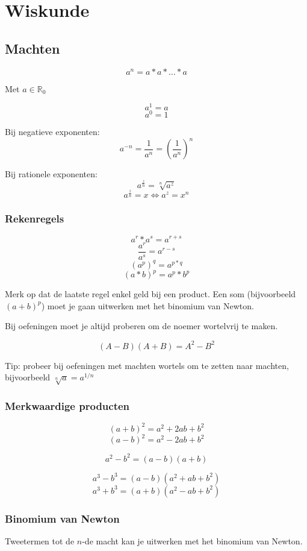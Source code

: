 \chapter{Wiskunde}

\section{Machten}

\[a^n = a * a * \ldots * a\]

Met \(a \in \mathbb{R}_{0} \)

\[a^1 = a\]
\[a^0 = 1\]


Bij negatieve exponenten:
\[a^{-n} = \frac{1}{a^n} = (\frac{1}{a^n})^n \]

Bij rationele exponenten:
\[a^\frac{z}{n} = \sqrt[n]{a^z} \]
\[a^\frac{z}{n} = x \iff a^z = x^n \]

\subsection{Rekenregels}

\[a^r * a^s = a^{r+s}\]
\[\frac{a^r}{a^s} = a^{r-s}\]
\[(a^p)^q = a ^{p*q}\]
\[(a*b)^p = a^p * b^p\]

Merk op dat de laatste regel enkel geld bij een product. Een som (bijvoorbeeld \( (a + b)^p \)) moet je gaan uitwerken met het binomium van Newton.

Bij oefeningen moet je altijd proberen om de noemer wortelvrij te maken.

\[(A-B)(A+B) = A^2 - B^2\]

Tip: probeer bij oefeningen met machten wortels om te zetten naar machten, bijvoorbeeld \( \sqrt[n]{a} = a^{1/n}  \)

\subsection{Merkwaardige producten}

\[(a+b)^2 = a^2 + 2ab + b^2 \]
\[(a-b)^2 = a^2 - 2ab + b^2 \]

\[a^2-b^2 = (a-b)(a+b) \]

\[a^3 - b^3 = (a-b)(a^2 + ab + b^2)\]
\[a^3 + b^3 = (a+b)(a^2 - ab + b^2)\]

\subsection{Binomium van Newton}

Tweetermen tot de \(n\)-de macht kan je uitwerken met het binomium van Newton.

